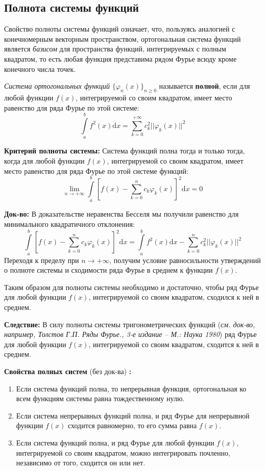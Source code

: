 \documentclass[12pt, a4paper]{article}
\newcommand{\di}{\mathrm{d}}
\begin{document}
\subsection{Полнота системы функций}

Свойство полноты системы функций означает, что, пользуясь аналогией с конечномерным векторным пространством, ортогональная система функций является \textit{базисом} для пространства функций, интегрируемых с полным квадратом, то есть любая функция представима рядом Фурье всюду кроме конечного числа точек.

\textit{Система ортогональных функций} $\{\varphi_n(x) \}_{n \geq 0}$ называется \textbf{полной}, если для любой функции $f(x)$, интегрируемой со своим квадратом, имеет место равенство для ряда Фурье по этой системе:
\[\int \limits_a^b f^2(x) \di x = \sum_{k=0}^{+\infty} c^2_k ||\varphi_k(x)||^2 \]

\textbf{Критерий полноты системы:} Система функций полна тогда и только тогда, когда для любой функции $f(x)$, интегрируемой со своим квадратом, имеет место равенство для ряда Фурье по этой системе функций:
\[\lim_{n \to +\infty} \int \limits_a^b \left[ f(x) - \sum_{k=0}^n c_k \varphi_k(x) \right]^2 \di x = 0 \]

\textbf{Док-во:} В доказательстве неравенства Бесселя мы получили равенство для минимального квадратичного отклонения:
\[\int \limits_a^b \left[ f(x) - \sum_{k=0}^n c_k \varphi_k(x) \right]^2 \di x = \int \limits_a^b f^2(x) \di x - \sum_{k=0}^n c^2_k ||\varphi_k(x)||^2 \]
Переходя к пределу при $n \to +\infty$, получим условие равносильности утверждений о полноте системы и сходимости ряда Фурье в среднем к функции $f(x)$.

Таким образом для полноты системы необходимо и достаточно, чтобы ряд Фурье для любой функции $f(x)$, интегрируемой со своим квадратом, сходился к ней в среднем.

\textbf{Следствие:} В силу полноты системы тригонометрических функций (\textit{см. док-во, например, Толстов Г.П. Ряды Фурье., 3-е издание – М.: Наука 1980}) ряд Фурье для любой функции $f(x)$, интегрируемой со своим квадратом, сходится к ней в среднем.

\textbf{Свойства полных систем} (без док-ва) \textbf{:}
\begin{enumerate}
 \item Если система функций полна, то непрерывная функция, ортогональная ко всем функциям системы равна тождественному нулю.
 \item Если система непрерывных функций полна, и ряд Фурье для непрерывной функции $f(x)$ сходится равномерно, то его сумма равна $f(x)$.
 \item Если система функций полна, и ряд Фурье для любой функции $f(x)$, интегрируемой со своим квадратом, можно интегрировать почленно, независимо от того, сходится он или нет.
\end{enumerate}
\end{document}
